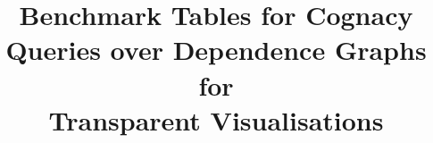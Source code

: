 \documentclass{article}
\begin{document}
\title{Benchmark Tables for Cognacy Queries over Dependence Graphs for \\Transparent Visualisations}
{\small}
{\small}
{\small}
\end{document}

